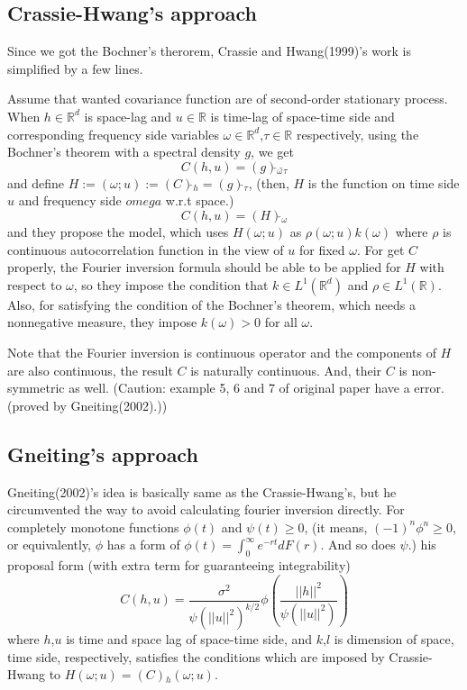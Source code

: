 \documentclass{article}
\begin{document}
{\subsection{Crassie-Hwang's approach}

Since we got the Bochner's therorem, Crassie and Hwang(1999)'s work is simplified by a few lines.

Assume that wanted covariance function are of second-order stationary process.
When $h\in \mathbb R^d$ is space-lag and $u\in \mathbb R$ is time-lag of space-time side 
and corresponding frequency side variables $\omega \in \mathbb R^d$,$\tau \in \mathbb R$ respectively,
using the Bochner's theorem with a spectral density $g$, we get
\[C(h,u)= (g)\check{ }_\omega \check{ }_\tau\]
and define $H:=(\omega;u):=(C)\hat{ }_h = (g)\check{ }_\tau$, (then, $H$ is the function on time side $u$ and frequency side $omega$ w.r.t space.)
\[C(h,u)= (H)\check{ }_\omega\]
and they propose the model, which uses $H(\omega;u)$ as $\rho(\omega;u)k(\omega)$ where $\rho$ is continuous autocorrelation function in the view of $u$ for fixed $\omega$.
For get $C$ properly, the Fourier inversion formula should be able to be applied for $H$ with respect to $\omega$,
so they impose the condition that $k \in L^1(\mathbb R^d)$ and $\rho \in L^1(\mathbb R)$.
Also, for satisfying the condition of the Bochner's theorem, which needs a nonnegative measure, they impose $k(\omega)>0$ for all $\omega$.

Note that the Fourier inversion is continuous operator and the components of $H$ are also continuous, the result $C$ is naturally continuous.
And, their $C$ is non-symmetric as well.
(Caution: example 5, 6 and 7 of original paper have a error.(proved by Gneiting(2002).))

\subsection{Gneiting's approach}
Gneiting(2002)'s idea is basically same as the Crassie-Hwang's, but he circumvented the way to avoid calculating fourier inversion directly.
For completely monotone functions $\phi(t)$ and $\psi(t)\geq 0$,
(it means, $(-1)^n\phi^{n} \geq 0$, or equivalently, $\phi$ has a form of $\phi(t)=\int_0^\infty e^{-rt}dF(r)$. And so does $\psi$.)
his proposal form (with extra term for guaranteeing integrability)
\[C(h,u)=\frac{\sigma^2}{\psi(||u||^2)^{k/2}} \phi(\frac{||h||^2}{\psi(||u||^2)})\]
where $h$,$u$ is time and space lag of space-time side, and $k$,$l$ is dimension of space, time side, respectively,
satisfies the conditions which are imposed by Crassie-Hwang to $H(\omega;u)=(C)\hat{ }_h(\omega;u)$.

}
\end{document}
